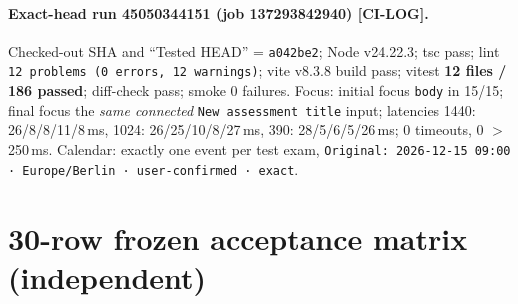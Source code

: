 \documentclass[11pt,a4paper]{article}
\newcommand{\sha}[1]{\texttt{\small #1}}
\begin{document}
\paragraph{Exact-head run 45050344151 (job 137293842940) [CI-LOG].} Checked-out SHA and ``Tested HEAD'' = \sha{a042be2}; Node v24.22.3; tsc pass; lint \texttt{12 problems (0 errors, 12 warnings)}; vite v8.3.8 build pass; vitest \textbf{12 files / 186 passed}; diff-check pass; smoke 0 failures. Focus: initial focus \texttt{body} in 15/15; final focus the \emph{same connected} \texttt{New assessment title} input; latencies 1440: 26/8/8/11/8\,ms, 1024: 26/25/10/8/27\,ms, 390: 28/5/6/5/26\,ms; 0 timeouts, 0 $>$250\,ms. Calendar: exactly one event per test exam, \texttt{Original: 2026-12-15 09:00 · Europe/Berlin · user-confirmed · exact}.

\section{30-row frozen acceptance matrix (independent)}
\end{document}
